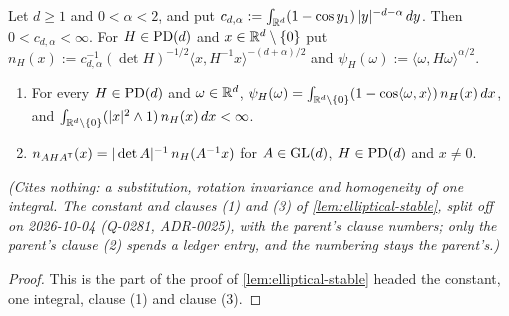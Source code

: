 \begin{lemma}
\label{lem:elliptical-stable-density}
\leanok
Let $d \ge 1$ and $0 < \alpha < 2$, and put
$c_{d,\alpha} := \int_{\mathbb{R}^d}(1 - \cos y_1)\,|y|^{-d-\alpha}\,dy$. Then $0 < c_{d,\alpha} < \infty$.
For $H \in \mathrm{PD}(d)$ and $x \in \mathbb{R}^d \setminus \{0\}$ put
$n_H(x) := c_{d,\alpha}^{-1}(\det H)^{-1/2}\langle x,H^{-1}x\rangle^{-(d+\alpha)/2}$ and
$\psi_H(\omega) := \langle\omega,H\omega\rangle^{\alpha/2}$.
\begin{enumerate}
\item[(1)] For every $H \in \mathrm{PD}(d)$ and $\omega \in \mathbb{R}^d$,
$\psi_H(\omega) = \int_{\mathbb{R}^d\setminus\{0\}}(1 - \cos\langle\omega,x\rangle)\,n_H(x)\,dx$, and
$\int_{\mathbb{R}^d\setminus\{0\}}(|x|^2 \wedge 1)\,n_H(x)\,dx < \infty$.
\item[(3)] $n_{AHA^{\mathsf{T}}}(x) = |\det A|^{-1}\,n_H(A^{-1}x)$ for $A \in \mathrm{GL}(d)$, $H \in \mathrm{PD}(d)$ and
$x \ne 0$.
\end{enumerate}
\statusT\quad\emph{(Cites nothing: a substitution, rotation invariance and homogeneity of one
integral. The constant and clauses (1) and (3) of \ref{lem:elliptical-stable}, split off on
2026-10-04 (Q-0281, ADR-0025), with the parent's clause numbers; only the parent's clause (2)
spends a ledger entry, and the numbering stays the parent's.)}
\end{lemma}

\begin{proof}
\leanok
This is the part of the proof of \ref{lem:elliptical-stable} headed the constant, one integral,
clause (1) and clause (3).
\end{proof}


